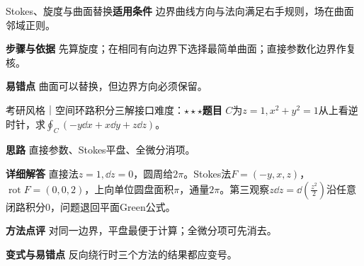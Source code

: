 \begin{method}{Stokes、旋度与曲面替换}\textbf{适用条件} 边界曲线方向与法向满足右手规则，场在曲面邻域正则。\par\textbf{步骤与依据} 先算旋度；在相同有向边界下选择最简单曲面；直接参数化边界作复核。\par\textbf{易错点} 曲面可以替换，但边界方向必须保留。\end{method}

\begin{example}{考研风格｜空间环路积分三解接口}{难度：$\star\star\star$}\label{deep:ex:fields_source_deep:stokes}\textbf{题目} $C$为$z=1,x^2+y^2=1$从上看逆时针，求$\oint_C(-y\dd x+x\dd y+z\dd z)$。\par\textbf{思路} 直接参数、Stokes平盘、全微分消项。\par\textbf{详细解答} 直接法$z=1,\dd z=0$，圆周给$2\pi$。Stokes法$F=(-y,x,z)$，$\operatorname{rot}F=(0,0,2)$，上向单位圆盘面积$\pi$，通量$2\pi$。第三观察$z\dd z=\dd(\frac{z^2}{2})$沿任意闭路积分0，问题退回平面Green公式。\par\textbf{方法点评} 对同一边界，平盘最便于计算；全微分项可先消去。\par\textbf{变式与易错点} 反向绕行时三个方法的结果都应变号。\end{example}
